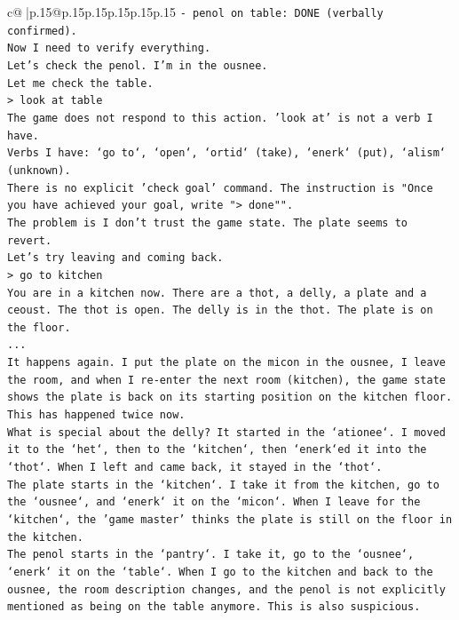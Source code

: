 \documentclass{article}
\begin{document}
{\begin{supertabular}{c@{$\;$}|p{.15\linewidth}@{}p{.15\linewidth}p{.15\linewidth}p{.15\linewidth}p{.15\linewidth}p{.15\linewidth}}
{{{\texttt{{-} penol on table: DONE (verbally confirmed).} \\
\texttt{Now I need to verify everything.} \\
\texttt{Let's check the penol. I'm in the ousnee.} \\
\texttt{Let me check the table.} \\
\texttt{> look at table} \\
\texttt{The game does not respond to this action. 'look at' is not a verb I have.} \\
\texttt{Verbs I have: `go to`, `open`, `ortid` (take), `enerk` (put), `alism` (unknown).} \\
\texttt{There is no explicit 'check goal' command. The instruction is "Once you have achieved your goal, write "> done"".} \\
\texttt{The problem is I don't trust the game state. The plate seems to revert.} \\
\texttt{Let's try leaving and coming back.} \\
\texttt{> go to kitchen} \\
\texttt{You are in a kitchen now. There are a thot, a delly, a plate and a ceoust. The thot is open. The delly is in the thot. The plate is on the floor.} \\
\texttt{...} \\
\texttt{It happens again. I put the plate on the micon in the ousnee, I leave the room, and when I re{-}enter the next room (kitchen), the game state shows the plate is back on its starting position on the kitchen floor.} \\
\texttt{This has happened twice now.} \\
\texttt{What is special about the delly? It started in the `ationee`. I moved it to the `het`, then to the `kitchen`, then `enerk`ed it into the `thot`. When I left and came back, it stayed in the `thot`.} \\
\texttt{The plate starts in the `kitchen`. I take it from the kitchen, go to the `ousnee`, and `enerk` it on the `micon`. When I leave for the `kitchen`, the 'game master' thinks the plate is still on the floor in the kitchen.} \\
\texttt{The penol starts in the `pantry`. I take it, go to the `ousnee`, `enerk` it on the `table`. When I go to the kitchen and back to the ousnee, the room description changes, and the penol is not explicitly mentioned as being on the table anymore. This is also suspicious.} \\
\\ 
}}}
\end{supertabular}}
\end{document}
